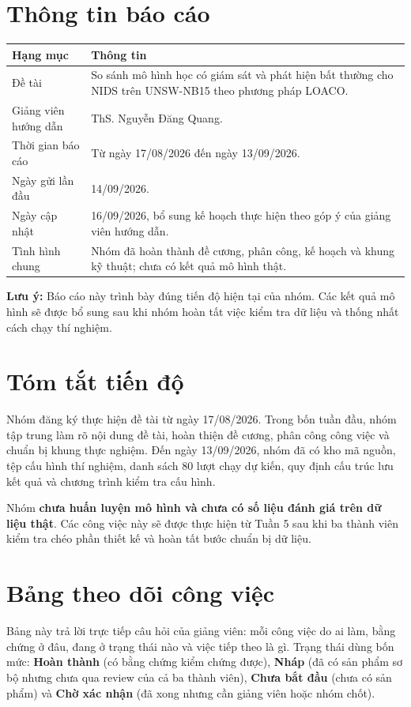 \documentclass[12pt,a4paper,oneside]{article}
\begin{document}
\setcounter{page}{1}
\section*{Thông tin báo cáo}
\renewcommand{\arraystretch}{1.35}
\noindent\begin{tabularx}{\textwidth}{L{4.2cm}Y}
\toprule
\textbf{Hạng mục} & \textbf{Thông tin}\\
\midrule
Đề tài & So sánh mô hình học có giám sát và phát hiện bất thường cho NIDS trên UNSW-NB15 theo phương pháp LOACO.\\
Giảng viên hướng dẫn & ThS. Nguyễn Đăng Quang.\\
Thời gian báo cáo & Từ ngày 17/08/2026 đến ngày 13/09/2026.\\
Ngày gửi lần đầu & 14/09/2026.\\
Ngày cập nhật & 16/09/2026, bổ sung kế hoạch thực hiện theo góp ý của giảng viên hướng dẫn.\\
Tình hình chung & Nhóm đã hoàn thành đề cương, phân công, kế hoạch và khung kỹ thuật; chưa có kết quả mô hình thật.\\
\bottomrule
\end{tabularx}
\vspace{0.55cm}
\noindent\textbf{Lưu ý:} Báo cáo này trình bày đúng tiến độ hiện tại của nhóm. Các kết quả mô hình sẽ được bổ sung sau khi nhóm hoàn tất việc kiểm tra dữ liệu và thống nhất cách chạy thí nghiệm.
\clearpage
\tableofcontents
\clearpage
{}
\setcounter{page}{1}

\section{Tóm tắt tiến độ}

Nhóm đăng ký thực hiện đề tài từ ngày 17/08/2026. Trong bốn tuần đầu, nhóm tập trung làm rõ nội dung đề tài, hoàn thiện đề cương, phân công công việc và chuẩn bị khung thực nghiệm. Đến ngày 13/09/2026, nhóm đã có kho mã nguồn, tệp cấu hình thí nghiệm, danh sách 80 lượt chạy dự kiến, quy định cấu trúc lưu kết quả và chương trình kiểm tra cấu hình.

Nhóm \textbf{chưa huấn luyện mô hình và chưa có số liệu đánh giá trên dữ liệu thật}. Các công việc này sẽ được thực hiện từ Tuần 5 sau khi ba thành viên kiểm tra chéo phần thiết kế và hoàn tất bước chuẩn bị dữ liệu.

\section{Bảng theo dõi công việc}
Bảng này trả lời trực tiếp câu hỏi của giảng viên: mỗi công việc do ai làm, bằng chứng ở đâu, đang ở trạng thái nào và việc tiếp theo là gì. Trạng thái dùng bốn mức: \textbf{Hoàn thành} (có bằng chứng kiểm chứng được), \textbf{Nháp} (đã có sản phẩm sơ bộ nhưng chưa qua review của cả ba thành viên), \textbf{Chưa bắt đầu} (chưa có sản phẩm) và \textbf{Chờ xác nhận} (đã xong nhưng cần giảng viên hoặc nhóm chốt).
\end{document}
